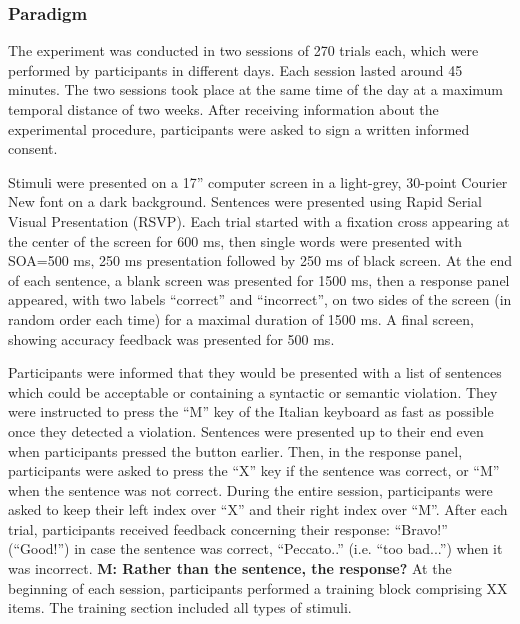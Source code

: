 \subsubsection{Paradigm}
The experiment was conducted in two sessions of 270 trials each, which were performed by participants in different days. Each session lasted around 45 minutes. The two sessions took place at the same time of the day at a maximum temporal distance of two weeks. After receiving information about the experimental procedure, participants were asked to sign a written informed consent. 

Stimuli were presented on a 17” computer screen in a light-grey, 30-point Courier New font on a dark background. Sentences were presented using Rapid Serial Visual Presentation (RSVP). Each trial started with a fixation cross appearing at the center of the screen for 600 ms, then single words were presented with SOA=500 ms, 250 ms presentation followed by 250 ms of black screen. At the end of each sentence, a blank screen was presented for 1500 ms, then a response panel appeared, with two labels “correct” and “incorrect”, on two sides of the screen (in random order each time) for a maximal duration of 1500 ms. A final screen, showing accuracy feedback was presented for 500 ms.

Participants were informed that they would be presented with a list of sentences which could be acceptable or containing a syntactic or semantic violation. They were instructed to press the “M” key of the Italian keyboard as fast as possible once they detected a violation. Sentences were presented up to their end even when participants pressed the button earlier. Then, in the response panel, participants were asked to press the “X” key if the sentence was correct, or “M” when the sentence was not correct. During the entire session, participants were asked to keep their left index over “X” and their right index over “M”. After each trial, participants received feedback concerning their response: ``Bravo!'' (``Good!'') in  case the sentence was correct, ``Peccato..'' (i.e. ``too bad...'') when it was incorrect. \textbf{M: Rather than the sentence, the response?} At the beginning of each session, participants performed a training block comprising XX items. The training section included all types of stimuli.


